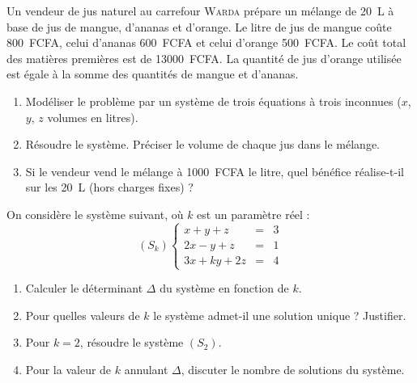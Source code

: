 \documentclass[11pt]{article}
\begin{document}
\begin{exercice}
Un vendeur de jus naturel au carrefour \textsc{Warda} prépare un mélange de \SI{20}{L} à base de jus de mangue, d'ananas et d'orange. Le litre de jus de mangue coûte \SI{800}{FCFA}, celui d'ananas \SI{600}{FCFA} et celui d'orange \SI{500}{FCFA}. Le coût total des matières premières est de \SI{13000}{FCFA}. La quantité de jus d'orange utilisée est égale à la somme des quantités de mangue et d'ananas.
\begin{enumerate}
    \item Modéliser le problème par un système de trois équations à trois inconnues ($x$, $y$, $z$ volumes en litres).
    \item Résoudre le système. Préciser le volume de chaque jus dans le mélange.
    \item Si le vendeur vend le mélange à \SI{1000}{FCFA} le litre, quel bénéfice réalise-t-il sur les \SI{20}{L} (hors charges fixes) ?
\end{enumerate}
\end{exercice}

\begin{exercice}
On considère le système suivant, où $k$ est un paramètre réel :
\[
(S_k) \left\{
\begin{array}{rcl}
x + y + z &=& 3 \\
2x - y + z &=& 1 \\
3x + ky + 2z &=& 4
\end{array}
\right.
\]
\begin{enumerate}
    \item Calculer le déterminant $\Delta$ du système en fonction de $k$.
    \item Pour quelles valeurs de $k$ le système admet-il une solution unique ? Justifier.
    \item Pour $k = 2$, résoudre le système $(S_2)$.
    \item Pour la valeur de $k$ annulant $\Delta$, discuter le nombre de solutions du système.
\end{enumerate}
\end{exercice}
\end{document}
